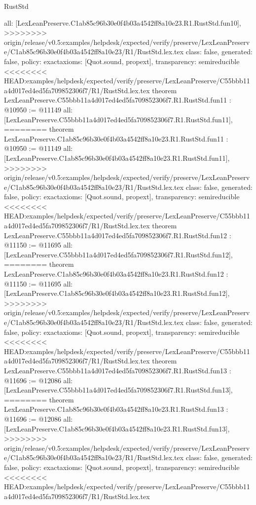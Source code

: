 \begin{lexlean}{RustStd}
\begin{coremodule}
{\begin{coremodule}
{{{{{{{{{{{{{{  all: [LexLeanPreserve.C1ab85c96b30e0f4b03a4542ff8a10e23.R1.RustStd.fun10],
>>>>>>>> origin/release/v0.5:examples/helpdesk/expected/verify/preserve/LexLeanPreserve/C1ab85c96b30e0f4b03a4542ff8a10e23/R1/RustStd.lex.tex
  class: false,
  generated: false,
  policy: exact{axioms: [Quot.sound, propext]},
  transparency: semireducible
}
<<<<<<<< HEAD:examples/helpdesk/expected/verify/preserve/LexLeanPreserve/C55bbb11a4d017ed4ed5fa709852306f7/R1/RustStd.lex.tex
theorem LexLeanPreserve.C55bbb11a4d017ed4ed5fa709852306f7.R1.RustStd.fun11 : @10950 := @11149 {
  all: [LexLeanPreserve.C55bbb11a4d017ed4ed5fa709852306f7.R1.RustStd.fun11],
========
theorem LexLeanPreserve.C1ab85c96b30e0f4b03a4542ff8a10e23.R1.RustStd.fun11 : @10950 := @11149 {
  all: [LexLeanPreserve.C1ab85c96b30e0f4b03a4542ff8a10e23.R1.RustStd.fun11],
>>>>>>>> origin/release/v0.5:examples/helpdesk/expected/verify/preserve/LexLeanPreserve/C1ab85c96b30e0f4b03a4542ff8a10e23/R1/RustStd.lex.tex
  class: false,
  generated: false,
  policy: exact{axioms: [Quot.sound, propext]},
  transparency: semireducible
}
<<<<<<<< HEAD:examples/helpdesk/expected/verify/preserve/LexLeanPreserve/C55bbb11a4d017ed4ed5fa709852306f7/R1/RustStd.lex.tex
theorem LexLeanPreserve.C55bbb11a4d017ed4ed5fa709852306f7.R1.RustStd.fun12 : @11150 := @11695 {
  all: [LexLeanPreserve.C55bbb11a4d017ed4ed5fa709852306f7.R1.RustStd.fun12],
========
theorem LexLeanPreserve.C1ab85c96b30e0f4b03a4542ff8a10e23.R1.RustStd.fun12 : @11150 := @11695 {
  all: [LexLeanPreserve.C1ab85c96b30e0f4b03a4542ff8a10e23.R1.RustStd.fun12],
>>>>>>>> origin/release/v0.5:examples/helpdesk/expected/verify/preserve/LexLeanPreserve/C1ab85c96b30e0f4b03a4542ff8a10e23/R1/RustStd.lex.tex
  class: false,
  generated: false,
  policy: exact{axioms: [Quot.sound, propext]},
  transparency: semireducible
}
<<<<<<<< HEAD:examples/helpdesk/expected/verify/preserve/LexLeanPreserve/C55bbb11a4d017ed4ed5fa709852306f7/R1/RustStd.lex.tex
theorem LexLeanPreserve.C55bbb11a4d017ed4ed5fa709852306f7.R1.RustStd.fun13 : @11696 := @12086 {
  all: [LexLeanPreserve.C55bbb11a4d017ed4ed5fa709852306f7.R1.RustStd.fun13],
========
theorem LexLeanPreserve.C1ab85c96b30e0f4b03a4542ff8a10e23.R1.RustStd.fun13 : @11696 := @12086 {
  all: [LexLeanPreserve.C1ab85c96b30e0f4b03a4542ff8a10e23.R1.RustStd.fun13],
>>>>>>>> origin/release/v0.5:examples/helpdesk/expected/verify/preserve/LexLeanPreserve/C1ab85c96b30e0f4b03a4542ff8a10e23/R1/RustStd.lex.tex
  class: false,
  generated: false,
  policy: exact{axioms: [Quot.sound, propext]},
  transparency: semireducible
}
<<<<<<<< HEAD:examples/helpdesk/expected/verify/preserve/LexLeanPreserve/C55bbb11a4d017ed4ed5fa709852306f7/R1/RustStd.lex.tex
}}}}}}}}}}}}}}}}
\end{coremodule}}
\end{coremodule}
\end{lexlean}
